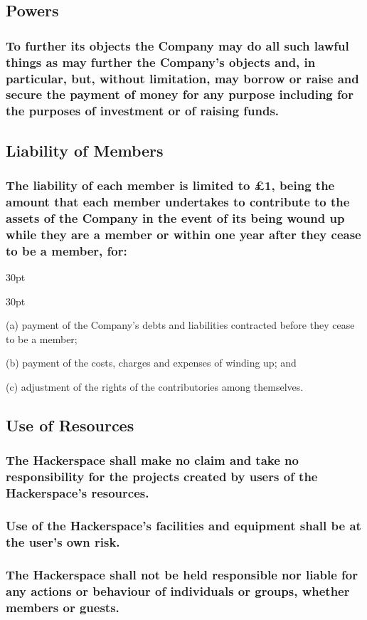 \documentclass[12pt]{article}
\def\clauseindent{30pt}
\newenvironment{subindentlist}{\begin{adjustwidth}{\clauseindent}{}\begin{labeledlist}{\clauseindent}}{\end{labeledlist}\end{adjustwidth}}
\begin{document}
\subsection{Powers}
\subsubsection{To further its objects the Company may do all such lawful things as may further the Company's objects and, in particular, but, without limitation, may borrow or raise and secure the payment of money for any purpose including for the purposes of investment or of raising funds.}

\subsection{Liability of Members}
\subsubsection{The liability of each member is limited to £1, being the amount that each member undertakes to contribute to the assets of the Company in the event of its being wound up while they are a member or within one year after they cease to be a member, for:}
\begin{subindentlist}
  \item [(a)] payment of the Company's debts and liabilities contracted before they cease to be a member;
  \item [(b)] payment of the costs, charges and expenses of winding up; and
  \item [(c)] adjustment of the rights of the contributories among themselves.
\end{subindentlist}

\subsection{Use of Resources}
\subsubsection{The Hackerspace shall make no claim and take no responsibility for the projects created by users of the Hackerspace's resources.}
\subsubsection{Use of the Hackerspace's facilities and equipment shall be at the user's own risk.}
\subsubsection{The Hackerspace shall not be held responsible nor liable for any actions or behaviour of individuals or groups, whether members or guests.}
\end{document}
